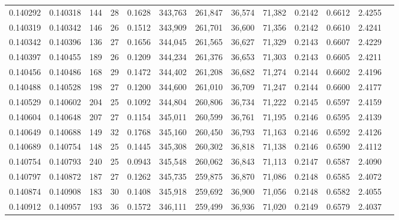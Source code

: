 \begin{tabular}{rrrrrrrrrrrrr}
0.140292 & 0.140318 & 144 &  28 &                                     0.1628 & 343,763 & 261,847 &  36,574 &  71,382 & 0.2142 & 0.6612 & 2.4255 \\
0.140319 & 0.140342 & 146 &  26 &                                     0.1512 & 343,909 & 261,701 &  36,600 &  71,356 & 0.2142 & 0.6610 & 2.4241 \\
0.140342 & 0.140396 & 136 &  27 &                                     0.1656 & 344,045 & 261,565 &  36,627 &  71,329 & 0.2143 & 0.6607 & 2.4229 \\
0.140397 & 0.140455 & 189 &  26 &                                     0.1209 & 344,234 & 261,376 &  36,653 &  71,303 & 0.2143 & 0.6605 & 2.4211 \\
0.140456 & 0.140486 & 168 &  29 &                                     0.1472 & 344,402 & 261,208 &  36,682 &  71,274 & 0.2144 & 0.6602 & 2.4196 \\
0.140488 & 0.140528 & 198 &  27 &                                     0.1200 & 344,600 & 261,010 &  36,709 &  71,247 & 0.2144 & 0.6600 & 2.4177 \\
0.140529 & 0.140602 & 204 &  25 &                                     0.1092 & 344,804 & 260,806 &  36,734 &  71,222 & 0.2145 & 0.6597 & 2.4159 \\
0.140604 & 0.140648 & 207 &  27 &                                     0.1154 & 345,011 & 260,599 &  36,761 &  71,195 & 0.2146 & 0.6595 & 2.4139 \\
0.140649 & 0.140688 & 149 &  32 &                                     0.1768 & 345,160 & 260,450 &  36,793 &  71,163 & 0.2146 & 0.6592 & 2.4126 \\
0.140689 & 0.140754 & 148 &  25 &                                     0.1445 & 345,308 & 260,302 &  36,818 &  71,138 & 0.2146 & 0.6590 & 2.4112 \\
0.140754 & 0.140793 & 240 &  25 &                                     0.0943 & 345,548 & 260,062 &  36,843 &  71,113 & 0.2147 & 0.6587 & 2.4090 \\
0.140797 & 0.140872 & 187 &  27 &                                     0.1262 & 345,735 & 259,875 &  36,870 &  71,086 & 0.2148 & 0.6585 & 2.4072 \\
0.140874 & 0.140908 & 183 &  30 &                                     0.1408 & 345,918 & 259,692 &  36,900 &  71,056 & 0.2148 & 0.6582 & 2.4055 \\
0.140912 & 0.140957 & 193 &  36 &                                     0.1572 & 346,111 & 259,499 &  36,936 &  71,020 & 0.2149 & 0.6579 & 2.4037 \\

\end{tabular}
